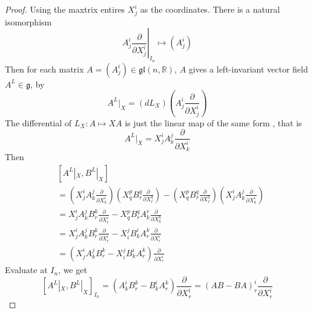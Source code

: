 \documentclass[../main.tex]{subfiles}
\begin{document}
\begin{proof}
    Using the  maxtrix entires \(  X^{i}_{j} \) as the coordinates. There is a natural isomorphism   \[
  \left.   A_{j}^{i} \frac{\partial }{\partial X_{j}^{i}} \right|_{I_{n}}\mapsto  \left( A_{j}^{i} \right) 
    \] Then for each matrix \(  A= \left( A_{j}^{i} \right)\in \mathfrak{gl}\left( n,\mathbb{R}  \right)    \), \(  A  \) gives a left-invariant vector field \(  A^{L}\in \mathfrak{g}  \), by \[
    A^{L}|_{X}= \left( d L_{X} \right)\left( A_{j}^{i}\frac{\partial }{\partial X_{j}^{i}} \right)  
    \]   The differential of \(  L_{X}: A\mapsto  XA  \) is just the linear map of the same form , that is \[
    A^{L}|_{X}=   X^{i}_{j}A^{j}_{k}\frac{\partial }{\partial X^{i}_{k}}
    \] Then \[
    \begin{aligned}
   & [A^{L}|_{X}, B^{L}|_{X}]\\ 
    &= \left( X^{i}_{j}A_{k}^{j} \frac{\partial }{\partial X^{i}_{k}}\right)\left( X^{p}_{q}B^{q}_{r}\frac{\partial }{\partial X^{q}_{r}} \right)   - \left( X^{p}_{q}B^{q}_{r}\frac{\partial }{\partial X^{q}_{r}} \right) \left( X^{i}_{j}A^{j}_{k}\frac{\partial }{\partial X^{i}_{k}} \right)\\ 
     &= X^{i}_{j}A^{j}_{k}B^{k}_{r}\frac{\partial }{\partial X^{i}_{r}}- X^{p}_{q}B^{q}_{r} A^{r}_{k} \frac{\partial }{\partial X^{q}_{k}}\\ 
      &=  X_{j}^{i}A_{k}^{j}B_{r}^{k}\frac{\partial }{\partial X^{i}_{r}}- X^{j}_{i}B^{i}_{k}A^{k}_{r}\frac{\partial }{\partial X^{i}_{r}}\\ 
       &= \left( X^{i}_{j}A^{j}_{k}B_{r}^{k}- X_{i}^{j}B_{k}^{i}A_{r}^{k} \right)\frac{\partial }{\partial X_{r}^{i}} 
    \end{aligned}
    \] Evaluate at \(  I_{n}  \), we get \[
    [A^{L}|_{X}, B^{L}|_{X}]_{I_{n}}= \left( A_{k}^{i}B_{r}^{k}- B_{k}^{i}A_{r}^{k} \right)\frac{\partial }{\partial X^{i}_{r}}= \left( AB-BA \right)_{r}^{i}\frac{\partial }{\partial X^{i}_{r}}  
    \] 
\end{proof}
\end{document}
